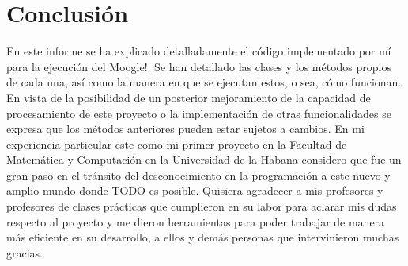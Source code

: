 \documentclass[a4paper,12pt]{article}
\begin{document}
\section{Conclusión}\label{sec:conclu}

En este informe se ha explicado detalladamente el código implementado por mí para la ejecución del Moogle!. Se han detallado las clases y los métodos propios de cada una, así como la manera en que se ejecutan estos, o sea, cómo funcionan. En vista de la posibilidad de un posterior mejoramiento de la capacidad de procesamiento de este proyecto o la implementación de otras funcionalidades se expresa que los métodos anteriores pueden estar sujetos a cambios. En mi experiencia particular este como mi primer proyecto en la Facultad de Matemática y Computación en la Universidad de la Habana considero que fue un gran paso en el tránsito del desconocimiento en la programación a este nuevo y amplio mundo donde \large{TODO} es posible. Quisiera agradecer a mis profesores y profesores de clases prácticas que cumplieron en su labor para aclarar mis dudas respecto al proyecto y me dieron herramientas para poder trabajar de manera más eficiente en su desarrollo, a ellos y demás personas que intervinieron muchas gracias.
\end{document}
